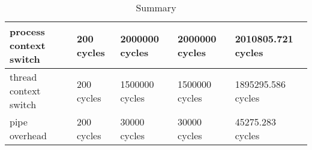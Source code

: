 \begin{table}[h]
\begin{center}
\begin{tabular}{| l | l | l | l | l |}
process context switch 	& 200 cycles		&	2000000 cycles	&2000000 cycles	& 2010805.721 cycles \\
\hline
thread context switch 	& 200 cycles		&	1500000 cycles	&1500000 cycles	& 1895295.586 cycles \\ 
\hline
pipe overhead			& 200 cycles		&	30000 cycles	&30000 cycles	& 45275.283 cycles \\ 
\hline\hline


















\end{tabular}
\end{center}






\caption{Summary}

\end{table}




\listoffigures

\listoftables